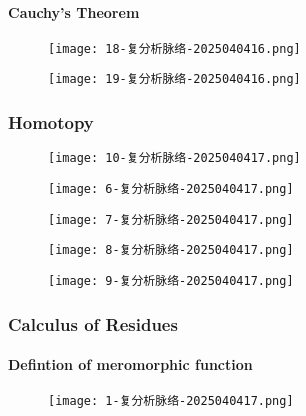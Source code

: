 \paragraph{Cauchy's Theorem}

\begin{figure}[H]
\centering
\texttt{[image: 18-复分析脉络-2025040416.png]}
\label{}
\end{figure}

\begin{figure}[H]
\centering
\texttt{[image: 19-复分析脉络-2025040416.png]}
\label{}
\end{figure}

\subsubsection{Homotopy}

\begin{figure}[H]
\centering
\texttt{[image: 10-复分析脉络-2025040417.png]}
\label{}
\end{figure}
\begin{figure}[H]
\centering
\texttt{[image: 6-复分析脉络-2025040417.png]}
\label{}
\end{figure}
\begin{figure}[H]
\centering
\texttt{[image: 7-复分析脉络-2025040417.png]}
\label{}
\end{figure}
\begin{figure}[H]
\centering
\texttt{[image: 8-复分析脉络-2025040417.png]}
\label{}
\end{figure}
\begin{figure}[H]
\centering
\texttt{[image: 9-复分析脉络-2025040417.png]}
\label{}
\end{figure}

\subsubsection{Calculus of Residues}

\paragraph{Defintion of meromorphic function}

\begin{figure}[H]
\centering
\texttt{[image: 1-复分析脉络-2025040417.png]}
\label{}
\end{figure}

